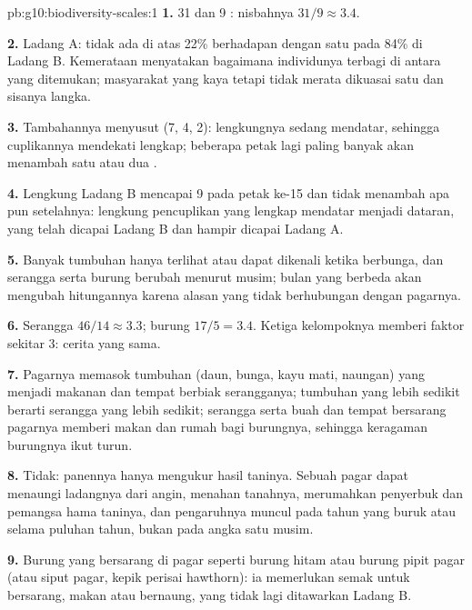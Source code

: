 \begin{solution}{pb:g10:biodiversity-scales:1}
\textbf{1.} 31 dan 9 : nisbahnya $31/9 \approx 3.4$.

\textbf{2.} Ladang A: tidak ada  di atas 22\% berhadapan dengan
satu  pada 84\% di Ladang B. Kemerataan menyatakan bagaimana
individunya terbagi di antara  yang ditemukan; masyarakat yang
kaya tetapi tidak merata dikuasai satu  dan sisanya langka.

\textbf{3.} Tambahannya menyusut (7, 4, 2): lengkungnya sedang
mendatar, sehingga cuplikannya mendekati lengkap; beberapa petak lagi
paling banyak akan menambah satu atau dua .

\textbf{4.} Lengkung Ladang B mencapai 9 pada petak ke-15 dan tidak
menambah apa pun setelahnya: lengkung pencuplikan yang lengkap mendatar
menjadi dataran, yang telah dicapai Ladang B dan hampir dicapai Ladang A.

\textbf{5.} Banyak tumbuhan hanya terlihat atau dapat dikenali ketika
berbunga, dan serangga serta burung berubah menurut musim; bulan yang
berbeda akan mengubah hitungannya karena alasan yang tidak berhubungan
dengan pagarnya.

\textbf{6.} Serangga $46/14 \approx 3.3$; burung $17/5 = 3.4$. Ketiga
kelompoknya memberi faktor sekitar 3: cerita yang sama.

\textbf{7.} Pagarnya memasok tumbuhan (daun, bunga, kayu mati,
naungan) yang menjadi makanan dan tempat berbiak serangganya; 
tumbuhan yang lebih sedikit berarti  serangga yang lebih
sedikit; serangga serta buah dan tempat bersarang pagarnya memberi
makan dan rumah bagi burungnya, sehingga keragaman burungnya ikut turun.

\textbf{8.} Tidak: panennya hanya mengukur hasil taninya. Sebuah pagar
dapat menaungi ladangnya dari angin, menahan tanahnya, merumahkan
penyerbuk dan pemangsa hama taninya, dan pengaruhnya muncul pada tahun
yang buruk atau selama puluhan tahun, bukan pada angka satu musim.

\textbf{9.} Burung yang bersarang di pagar seperti burung hitam atau
burung pipit pagar (atau siput pagar, kepik perisai hawthorn): ia
memerlukan semak untuk bersarang, makan atau bernaung, yang tidak lagi
ditawarkan Ladang B.


\end{solution}
